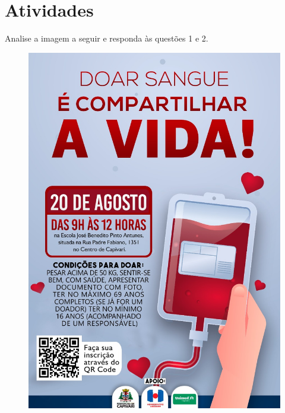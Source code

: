 



\section*{Atividades}

Analise a imagem a seguir e responda às questões 1 e 2. 

\begin{figure}[H]
\centering
\includegraphics[scale=0.35]{./imgSAEB_7_POR/media/image1.png}
\end{figure}

